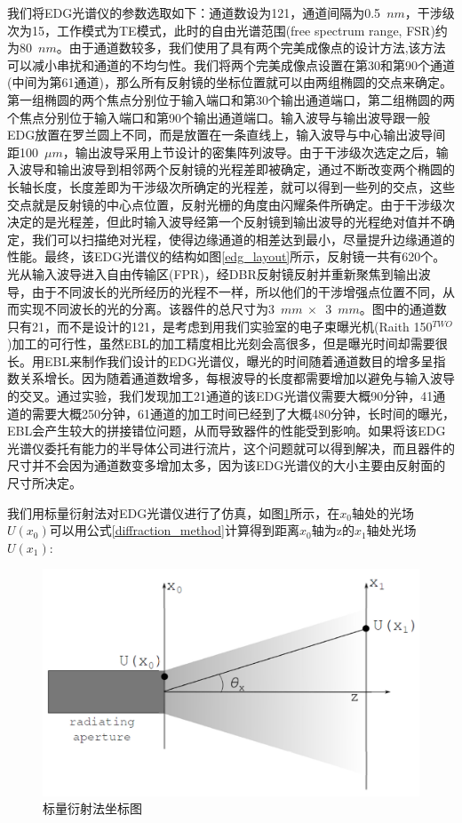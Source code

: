 我们将EDG光谱仪的参数选取如下：通道数设为121，通道间隔为0.5~$nm$，干涉级次为15，工作模式为TE模式，此时的自由光谱范围(free spectrum range, FSR)约为80~$nm$。由于通道数较多，我们使用了具有两个完美成像点的设计方法\cite{horst2009silicon,horst2008echelle},该方法可以减小串扰和通道的不均匀性。我们将两个完美成像点设置在第30和第90个通道(中间为第61通道)，那么所有反射镜的坐标位置就可以由两组椭圆的交点来确定。第一组椭圆的两个焦点分别位于输入端口和第30个输出通道端口，第二组椭圆的两个焦点分别位于输入端口和第90个输出通道端口。输入波导与输出波导跟一般EDG放置在罗兰圆上不同，而是放置在一条直线上，输入波导与中心输出波导间距100~$\mu m$，输出波导采用上节设计的密集阵列波导。由于干涉级次选定之后，输入波导和输出波导到相邻两个反射镜的光程差即被确定，通过不断改变两个椭圆的长轴长度，长度差即为干涉级次所确定的光程差，就可以得到一些列的交点，这些交点就是反射镜的中心点位置，反射光栅的角度由闪耀条件所确定。由于干涉级次决定的是光程差，但此时输入波导经第一个反射镜到输出波导的光程绝对值并不确定，我们可以扫描绝对光程，使得边缘通道的相差达到最小，尽量提升边缘通道的性能。最终，该EDG光谱仪的结构如图\ref{edg_layout}所示，反射镜一共有620个。光从输入波导进入自由传输区(FPR)，经DBR反射镜反射并重新聚焦到输出波导，由于不同波长的光所经历的光程不一样，所以他们的干涉增强点位置不同，从而实现不同波长的光的分离。该器件的总尺寸为3~$mm~\times$~3~$mm$。图中的通道数只有21，而不是设计的121，是考虑到用我们实验室的电子束曝光机(Raith 150$^{TWO}$)加工的可行性，虽然EBL的加工精度相比光刻会高很多，但是曝光时间却需要很长。用EBL来制作我们设计的EDG光谱仪，曝光的时间随着通道数目的增多呈指数关系增长。因为随着通道数增多，每根波导的长度都需要增加以避免与输入波导的交叉。通过实验，我们发现加工21通道的该EDG光谱仪需要大概90分钟，41通道的需要大概250分钟，61通道的加工时间已经到了大概480分钟，长时间的曝光，EBL会产生较大的拼接错位问题，从而导致器件的性能受到影响。如果将该EDG光谱仪委托有能力的半导体公司进行流片，这个问题就可以得到解决，而且器件的尺寸并不会因为通道数变多增加太多，因为该EDG光谱仪的大小主要由反射面的尺寸所决定。


我们用标量衍射法\cite{pathak2014silicon}对EDG光谱仪进行了仿真，如图\ref{edg_diffraction_method}所示，在$x_{0}$轴处的光场$U(x_{0})$可以用公式\ref{diffraction_method}计算得到距离$x_{0}$轴为z的$x_{1}$轴处光场$U(x_{1})$:

\begin{figure}[htb]
	\centering
	\includegraphics[width=13cm]{./Pictures/edg_diffraction_method.jpg}
	\captionsetup{justification=centering}
	\caption{标量衍射法坐标图}
	\label{edg_diffraction_method}
\end{figure}

